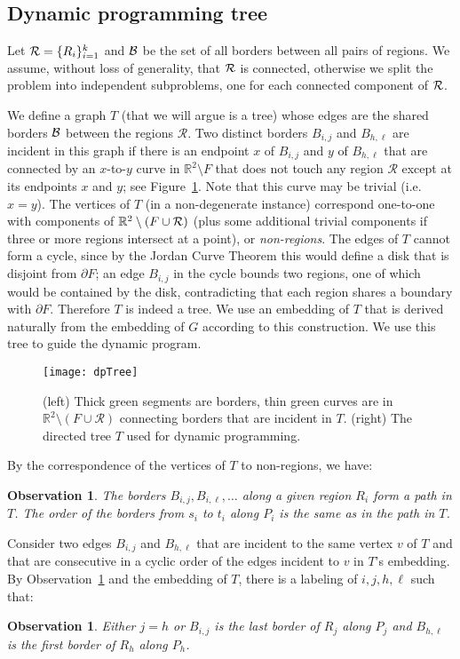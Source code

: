 \documentclass[11pt,twoside]{article}
\newtheorem{observation}[theorem]{Observation}
\newcommand{\region}[1]{R_{#1}}
\newcommand{\border}[2]{B_{#1,#2}}
\begin{document}
\subsection{Dynamic programming tree}
Let ${\cal R} = \{\region{i}\}_{i=1}^k$ and $\cal B$ be the set of all borders between all pairs of regions.
We assume, without loss of generality, that $\cal R$ is connected, otherwise we  split the problem into independent subproblems, one for each connected component of $\cal R$.

We define a graph $T$ (that we will argue is a tree) whose edges are the shared borders $\cal B$ between the regions $\mathcal R$.
Two distinct borders $\border{i}{j}$ and $B_{h,\ell}$ are incident in this graph if there is an endpoint $x$ of $\border{i}{j}$ and $y$ of $B_{h,\ell}$  that are connected by an $x$-to-$y$ curve in $\mathbb{R}^2 \setminus F$ that does not touch any region $\mathcal R$ except at its endpoints $x$ and $y$;  see Figure~\ref{fig:T}.  Note that this curve may be trivial (i.e.\ $x = y$).  The vertices of $T$ (in a non-degenerate instance) correspond one-to-one with components of $\mathbb{R}^2 \setminus (F \cup {\cal R})$ (plus some additional trivial components if three or more regions intersect at a point), or {\em non-regions}. The edges of $T$ cannot form a cycle, since by the Jordan Curve Theorem this would define a disk that is disjoint from $\partial F$;  an edge $B_{i,j}$ in the cycle bounds two regions, one of which would be contained by the disk, contradicting that each region shares a boundary with $\partial F$.  Therefore $T$ is indeed a tree.   We use an embedding of $T$ that is derived naturally from the embedding of $G$ according to this construction.  We use this tree to guide the dynamic program.


\begin{figure}[ht]
  \centering
        \texttt{[image: dpTree]}
      \caption{(left) Thick green segments are borders, thin green curves are in $\mathbb{R}^2\setminus (F\cup \mathcal{R})$ connecting borders that are incident in $T$. (right) The directed tree $T$ used for dynamic programming.}
\label{fig:T}
\end{figure}

 
By the correspondence of the vertices of $T$ to non-regions, we have:
\begin{observation}\label{obs:region-path-T}
  The borders $B_{i,j}, B_{i,\ell}, \ldots$ along a given region $R_i$ form a path in $T$.  The order of the borders from $s_i$ to $t_i$ along $P_i$ is the same as in the path in $T$.
\end{observation}
Consider two edges $B_{i,j}$ and $B_{h,\ell}$ that are incident to the same vertex $v$ of $T$ and that are consecutive in a cyclic order of the edges incident to $v$ in $T$'s embedding.  By Observation~\ref{obs:region-path-T} and the embedding of $T$, there is a labeling of $i,j,h,\ell$ such that:
\begin{observation}\label{obs:first-last-border}
  Either $j = h$ or $B_{i,j}$ is the last border of $R_j$ along $P_j$ and $B_{h,\ell}$ is the first border of $R_h$ along $P_h$.
\end{observation}
\end{document}
